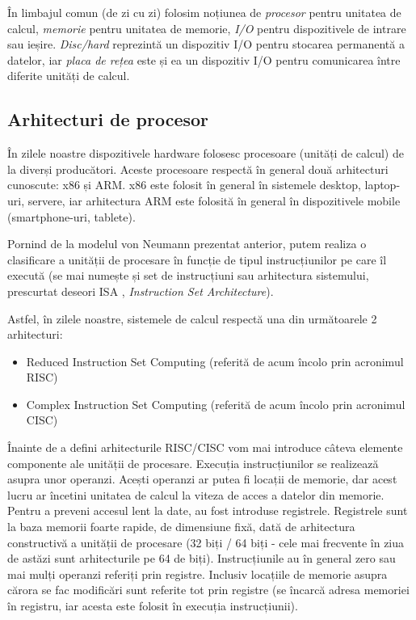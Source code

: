 În limbajul comun (de zi cu zi) folosim noțiunea de \textit{procesor} pentru
unitatea de calcul, \textit{memorie} pentru unitatea de memorie, \textit{I/O}
pentru dispozitivele de intrare sau ieșire. \textit{Disc/hard} reprezintă un
dispozitiv I/O pentru stocarea permanentă a datelor, iar \textit{placa de rețea}
este și ea un dispozitiv I/O pentru comunicarea între diferite unități de
calcul.

\subsection{Arhitecturi de procesor}
\label{sec:hw:class:cpu}

În zilele noastre dispozitivele hardware folosesc procesoare (unități de calcul)
de la diverși producători. Aceste procesoare respectă în general două
arhitecturi cunoscute: x86 și ARM. x86 este folosit în general în sistemele
desktop, laptop-uri, servere, iar arhitectura ARM este folosită în general în
dispozitivele mobile (smartphone-uri, tablete).

Pornind de la modelul von Neumann prezentat anterior, putem realiza o
clasificare a unității de procesare în funcție de tipul instrucțiunilor pe care
îl execută (se mai numește și set de instrucțiuni sau arhitectura sistemului,
prescurtat deseori ISA , \textit{Instruction
Set Architecture}).

Astfel, în zilele noastre, sistemele de calcul respectă una din următoarele 2
arhitecturi:

\begin{itemize}
  \item Reduced Instruction Set Computing (referită de acum încolo prin
    acronimul RISC) 
  \item Complex Instruction Set Computing (referită de acum încolo prin
    acronimul CISC) 
\end{itemize}

Înainte de a defini arhitecturile RISC/CISC vom mai introduce câteva elemente
componente ale unității de procesare. Execuția instrucțiunilor se realizează
asupra unor operanzi. Acești operanzi ar putea fi locații de memorie, dar acest
lucru ar încetini unitatea de calcul la viteza de acces a datelor din memorie.
Pentru a preveni accesul lent la date, au fost introduse registrele. Registrele
sunt la baza memorii foarte rapide, de dimensiune fixă, dată de arhitectura
constructivă a unității de procesare (32 biți / 64 biți - cele mai frecvente în ziua
de astăzi sunt arhitecturile pe 64 de biți). Instrucțiunile au în general zero
sau mai mulți operanzi referiți prin registre. Inclusiv locațiile de memorie
asupra cărora se fac modificări sunt referite tot prin registre (se încarcă
adresa memoriei în registru, iar acesta este folosit în execuția instrucțiunii).

